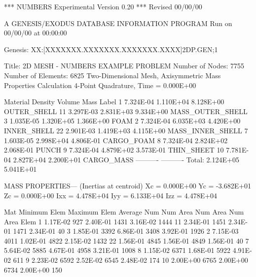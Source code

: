                    *** NUMBERS Experimental Version 0.20 ***
                                Revised 00/00/00

                  A GENESIS/EXODUS DATABASE INFORMATION PROGRAM
                           Run on 00/00/00 at 00:00:00

     Genesis: XX:[XXXXXXX.XXXXXXX.XXXXXXX.XXXX]2DP.GEN;1

     Title:   2D MESH - NUMBERS EXAMPLE PROBLEM 
     Number of Nodes:      7755
     Number of Elements:   6825
     Two-Dimensional Mesh, Axisymmetric
     Mass Properties Calculation
     4-Point Quadrature, Time =  0.000E+00

     Material    Density        Volume          Mass        Label
         1      7.324E-04      1.110E+04      8.128E+00     OUTER_SHELL     
        11      3.297E-03      2.831E+03      9.334E+00     MASS_OUTER_SHELL
         3      1.035E-05      1.320E+05      1.366E+00     FOAM            
         2      7.324E-04      6.035E+03      4.420E+00     INNER_SHELL     
        22      2.901E-03      1.419E+03      4.115E+00     MASS_INNER_SHELL
         7      1.603E-05      2.998E+04      4.806E-01     CARGO_FOAM      
         8      7.324E-04      2.824E+02      2.068E-01     PUNCH           
         9      7.324E-04      4.879E+02      3.573E-01     THIN_SHEET      
        10      7.781E-04      2.827E+04      2.200E+01     CARGO_MASS      
                              ----------     ----------
                  Total:       2.124E+05      5.041E+01

     MASS PROPERTIES--- (Inertias at centroid)
      Xc =  0.000E+00   Yc = -3.682E+01   Zc =  0.000E+00
     Ixx =  4.478E+04  Iyy =  6.133E+04  Izz =  4.478E+04

     Mat  Minimum   Elem   Maximum   Elem   Average   Num
     Num    Area    Num      Area    Num      Area    Elem
      1   1.17E-02   927   2.40E-01  1431   3.16E-02  1444
     11   2.34E-01  1451   2.34E-01  1471   2.34E-01    40
      3   1.85E-01  3392   6.86E-01  3408   3.92E-01  1926
      2   7.15E-03  4011   1.02E-01  4822   2.15E-02  1432
     22   1.56E-01  4845   1.56E-01  4849   1.56E-01    40
      7   5.64E-02  5885   4.67E-01  4958   3.21E-01  1008
      8   1.15E-02  6371   1.68E-01  5922   4.91E-02   611
      9   2.23E-02  6592   2.52E-02  6545   2.48E-02   174
     10   2.00E+00  6765   2.00E+00  6734   2.00E+00   150
